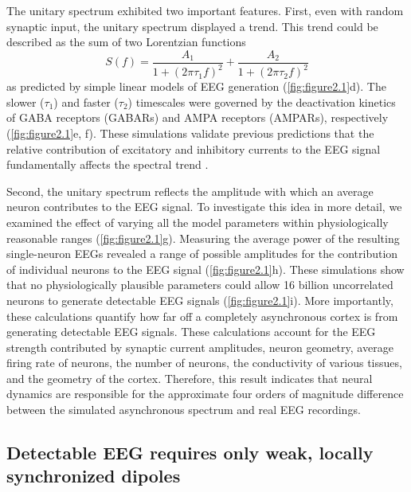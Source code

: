 The unitary spectrum exhibited two important features. First, even with random synaptic input, the unitary spectrum displayed a trend. This trend could be described as the sum of two Lorentzian functions
\begin{equation} \label{eq:linear_model}
    S(f) = \frac{A_1}{1+(2\pi \tau_1 f)^2} + \frac{A_2}{1+(2\pi \tau_2 f)^2}
\end{equation}
as predicted by simple linear models of EEG generation \cite{Gao2017,Miller2009} (\autoref{fig:figure2.1}d). The slower ($\tau_1$) and faster ($\tau_2$) timescales were governed by the deactivation kinetics of GABA receptors (GABARs) and AMPA receptors (AMPARs), respectively (\autoref{fig:figure2.1}e, f). These simulations validate previous predictions that the relative contribution of excitatory and inhibitory currents to the EEG signal fundamentally affects the spectral trend \cite{Gao2017}.

Second, the unitary spectrum reflects the amplitude with which an average neuron contributes to the EEG signal. To investigate this idea in more detail, we examined the effect of varying all the model parameters within physiologically reasonable ranges (\autoref{fig:figure2.1}g). Measuring the average power of the resulting single-neuron EEGs revealed a range of possible amplitudes for the contribution of individual neurons to the EEG signal (\autoref{fig:figure2.1}h). These simulations show that no physiologically plausible parameters could allow 16 billion uncorrelated neurons to generate detectable EEG signals (\autoref{fig:figure2.1}i). More importantly, these calculations quantify how far off a completely asynchronous cortex is from generating detectable EEG signals. These calculations account for the EEG strength contributed by synaptic current amplitudes, neuron geometry, average firing rate of neurons, the number of neurons, the conductivity of various tissues, and the geometry of the cortex. Therefore, this result indicates that neural dynamics are responsible for the approximate four orders of magnitude difference between the simulated asynchronous spectrum and real EEG recordings.

\subsection{Detectable EEG requires only weak, locally synchronized dipoles}

